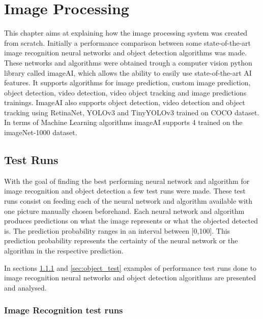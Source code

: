 \cleardoublepage

\chapter{Image Processing}
\label{ch:initial_work}


\par This chapter aims at explaining how the image processing system was created from scratch. Initially a performance comparison between some state-of-the-art image recognition neural networks and object detection algorithms was made. These networks and algorithms were obtained trough a computer vision python library called imageAI, which allows the ability to easily use state-of-the-art AI features. It supports algorithms for image prediction, custom image prediction, object detection, video detection, video object tracking and image predictions trainings. ImageAI also supports object detection, video detection and object tracking using RetinaNet, YOLOv3 and TinyYOLOv3 trained on COCO dataset. In terms of Machine Learning algorithms imageAI supports 4 trained on the imageNet-1000 dataset. \cite{ImageAI}




  \section{Test Runs}

  \par With the goal of finding the best performing neural network and algorithm for image recognition and object detection a few test runs were made. These test runs consist on feeding each of the neural network and algorithm available with one picture manually chosen beforehand. Each neural network and algorithm produces predictions on what the image represents or what the objected detected is. The prediction probability ranges in an interval between [0,100]. This prediction probability represents the certainty of the neural network or the algorithm in the respective prediction.
  \par In sections \ref{sec:image_test} and \ref{sec:object_test} examples of performance test runs done to image recognition neural networks and object detection algorithms are  presented and analysed.

  \subsection{Image Recognition test runs}
  \label{sec:image_test}


